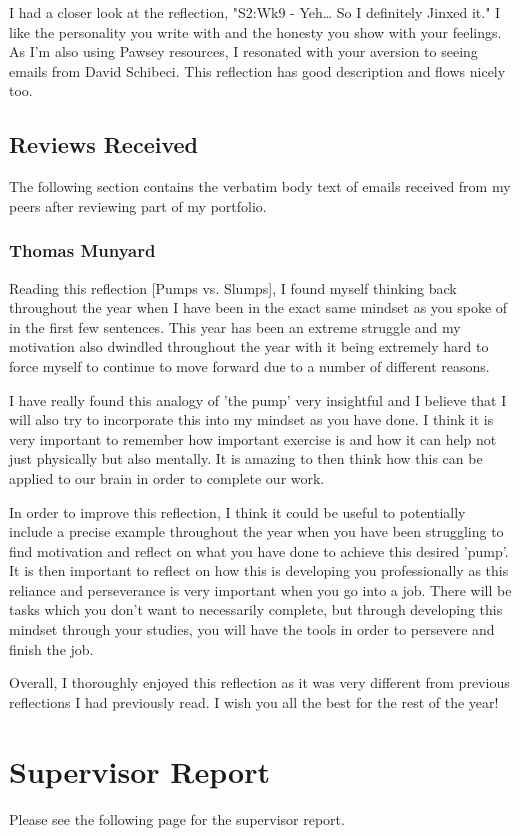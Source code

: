 \documentclass[11pt]{article}
\begin{document}
I had a closer look at the reflection, "S2:Wk9 - Yeh… So I definitely Jinxed it." I like the personality you write with and the honesty you show with your feelings. As I'm also using Pawsey resources, I resonated with your aversion to seeing emails from David Schibeci. This reflection has good description and flows nicely too.

\subsection{Reviews Received}

The following section contains the verbatim body text of emails received from my peers after reviewing part of my portfolio.

\subsubsection{Thomas Munyard}

Reading this reflection [Pumps vs. Slumps], I found myself thinking back throughout the year when I have been in the exact same mindset as you spoke of in the first few sentences. This year has been an extreme struggle and my motivation also dwindled throughout the year with it being extremely hard to force myself to continue to move forward due to a number of different reasons.  
 
I have really found this analogy of 'the pump' very insightful and I believe that I will also try to incorporate this into my mindset as you have done. I think it is very important to remember how important exercise is and how it can help not just physically but also mentally. It is amazing to then think how this can be applied to our brain in order to complete our work.  
 
In order to improve this reflection, I think it could be useful to potentially include a precise example throughout the year when you have been struggling to find motivation and reflect on what you have done to achieve this desired 'pump'. It is then important to reflect on how this is developing you professionally as this reliance and perseverance is very important when you go into a job. There will be tasks which you don't want to necessarily complete, but through developing this mindset through your studies, you will have the tools in order to persevere and finish the job. 
 
Overall, I thoroughly enjoyed this reflection as it was very different from previous reflections I had previously read. I wish you all the best for the rest of the year! 


\appendix

\section{Supervisor Report}
\label{appendix:suprep}

Please see the following page for the supervisor report.


\end{document}
